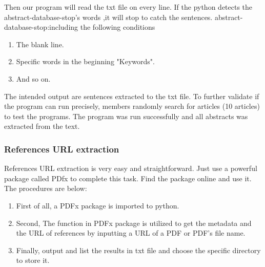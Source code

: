 	
	Then our program will read the txt file on every line.
	If the python detects the abstract-database-stop's words ,it will stop to catch the sentences.
	abstract-database-stop:including the following conditions
	
	\begin{enumerate}
			
		\item The blank line.
		\item Specific words in the beginning "Keywords".
		\item And so on.
					
	\end{enumerate}
	
	The intended output are sentences extracted to the txt file.
	To further validate if the program can run precisely, members randomly search for articles (10 articles) to test the programs.
	The program was run successfully and all abstracts was extracted from the text.
	 	
\subsubsection{References URL extraction}

References URL extraction is very easy and straightforward.
Just use a powerful package called PDfx to complete this task.
Find the package online and use it.
The procedures are below:

\begin{enumerate}
	
	\item First of all, a PDFx package is imported to python.
	\item Second, The function in PDFx package is utilized to get the metadata and the URL of references by inputting a URL of a PDF or PDF's file name.
	\item Finally, output and list the results in txt file and choose the specific directory to store it.

\end{enumerate}
 
